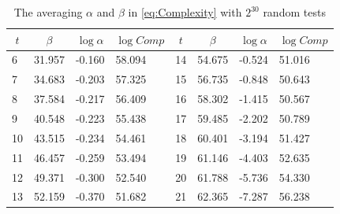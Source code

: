 \begin{table}[htbp]
  \centering
  \caption{The averaging $\alpha$ and $\beta$ in \eqref{eq:Complexity} with $2^{30}$ random tests}\label{tab:ZhangAlphaAndBeta}
    \begin{tabular}{|l|l|l|l|l|l|l|l|}
    \hline
    \multicolumn{1}{|c|}{$t$} & \multicolumn{1}{c|}{$\beta$} & \multicolumn{1}{c|}{$\log\alpha$} & \multicolumn{1}{c|}{$\log Comp$} & \multicolumn{1}{c|}{$t$} & \multicolumn{1}{c|}{$\beta$} & \multicolumn{1}{c|}{$\log\alpha$} & \multicolumn{1}{c|}{$\log Comp$} \\
    \hline

    6    & 31.957 & -0.160 & 58.094 & 14    & 54.675 & -0.524 &  51.016\\
    \hline
    7    & 34.683 & -0.203 & 57.325 & 15    & 56.735 & -0.848 &  50.643\\
    \hline
    8    & 37.584 & -0.217 & 56.409 & 16    & 58.302 & -1.415 &  50.567\\
    \hline
    9    &  40.548 & -0.223 & 55.438 & 17    & 59.485 & -2.202 &  50.789\\
    \hline
    10    & 43.515 & -0.234 & 54.461 & 18    & 60.401 & -3.194 &  51.427\\
    \hline
    11    & 46.457 & -0.259 & 53.494 & 19    & 61.146 & -4.403 &  52.635\\
    \hline
    12    & 49.371 & -0.300 & 52.540 & 20    & 61.788 & -5.736 &  54.330\\
    \hline
    13    & 52.159 & -0.370 & 51.682 & 21    & 62.365 & -7.287 &  56.238\\
    \hline
    \end{tabular}%
\end{table}%


